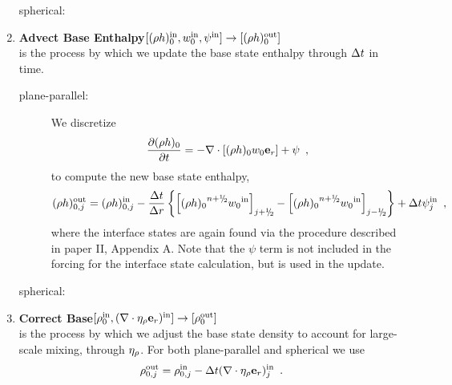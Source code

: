 \begin{enumerate}
\begin{description}
\item[spherical:]

\end{description}

\item {\bf Advect Base Enthalpy}$[(\rho h)_0^{\mathrm{in}},w_0^{\mathrm{in}},\psi^{\mathrm{in}}] \rightarrow [(\rho h)_0^{\mathrm{out}}]$\\
is the process by which we update the base state enthalpy through $\Delta t$ in time.
\begin{description}

\item[plane-parallel:] We discretize
\begin{equation}
\frac{\partial (\rho h)_0}{\partial t} = -\nabla\cdot\left[(\rho h)_0w_0\mathbf{e}_r\right] 
+ \psi \enskip ,
\end{equation}
to compute the new base state enthalpy,
\begin{equation}
(\rho h)_{0,j}^{\outp} = (\rho h)_{0,j}^{\inp} - \frac{\dt}{\Delta r}
\left\{ \left[ {(\rho h)_0}^{\nph} {w_0}^{\inp}\right]_{j+\myhalf} -  
         \left[ {(\rho h)_0}^{\nph} {w_0}^{\inp}\right]_{j-\myhalf} \right\}
+ \dt\psi_j^{\inp} \enskip ,
\end{equation}
where the interface states are again found via the procedure described
in paper II, Appendix A.  Note that the $\psi$ term is not included in 
the forcing for the interface state calculation, but is used in the update.

\item[spherical:]

\end{description}

\item {\bf Correct Base}$[\rho_0^{\mathrm{in}}, (\nabla\cdot\eta_{\rho}\mathbf{e}_r)^{\mathrm{in}}] \rightarrow [\rho_0^{\mathrm{out}}]$\\
is the process by which we adjust the base state density to account for
large-scale mixing, through $\eta_{\rho}$.  For both plane-parallel and spherical
we use
\begin{equation}
\rho_{0,j}^{\mathrm{out}} = \rho_{0,j}^{\mathrm{in}} - \Delta t (\nabla\cdot\eta_{\rho}\mathbf{e}_r)^{\mathrm{in}}_j \enskip . 
\end{equation}

\end{enumerate}



